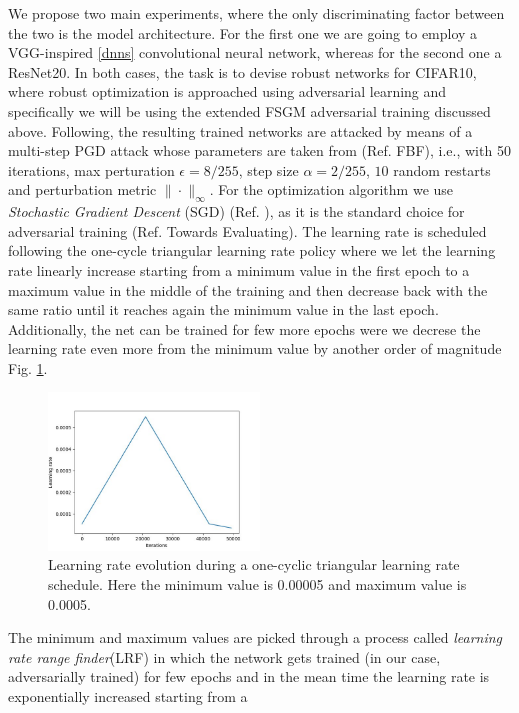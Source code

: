 \documentclass[LaM,binding=0.6cm]{./packages/sapthesis/sapthesis}
\begin{document}
We propose two main experiments, where the only discriminating factor between the 
two is the model architecture. For the first one we are going to employ a VGG-inspired
\ref{dnns} convolutional neural network, whereas for the second one a ResNet20. In
both cases, the task is to devise robust networks for CIFAR10, where robust optimization 
is approached using adversarial learning and specifically we will be using the extended 
FSGM adversarial training discussed above. Following, the resulting trained networks 
are attacked by means of a multi-step PGD attack whose parameters are taken from 
(Ref. FBF), i.e., with 50 iterations, max perturation $\epsilon = 8/255$, step size $\alpha = 2/255$, $10$ random restarts
and perturbation metric $\| \cdot \|_{\infty}$. For the optimization algorithm we use 
\textit{Stochastic Gradient Descent } (SGD) (Ref. ), as it is the standard choice for 
adversarial training (Ref. Towards Evaluating). The learning rate is scheduled following
the one-cycle triangular learning rate policy where we let the learning rate linearly 
increase starting from a minimum value in the first epoch to a maximum value in the 
middle of the training and then decrease back with the same ratio until it reaches 
again the minimum value in the last epoch. Additionally, the net can be trained for 
few more epochs were we decrese the learning rate even more from the minimum value 
by another order of magnitude Fig. \ref{fig:oclr}.
\begin{figure}[h]
    \centering
    \includegraphics[width=0.50\textwidth]{oclrp}
    \caption{Learning rate evolution during a one-cyclic triangular learning rate schedule.
    Here the minimum value is 0.00005 and maximum value is 0.0005.}
    \label{fig:oclr}
\end{figure}
The minimum and maximum values are picked through a process called \textit{learning 
rate range finder}(LRF) in which the network gets trained (in our case, adversarially trained)
for few epochs and in the mean time the learning rate is exponentially increased starting from a 
\end{document}
